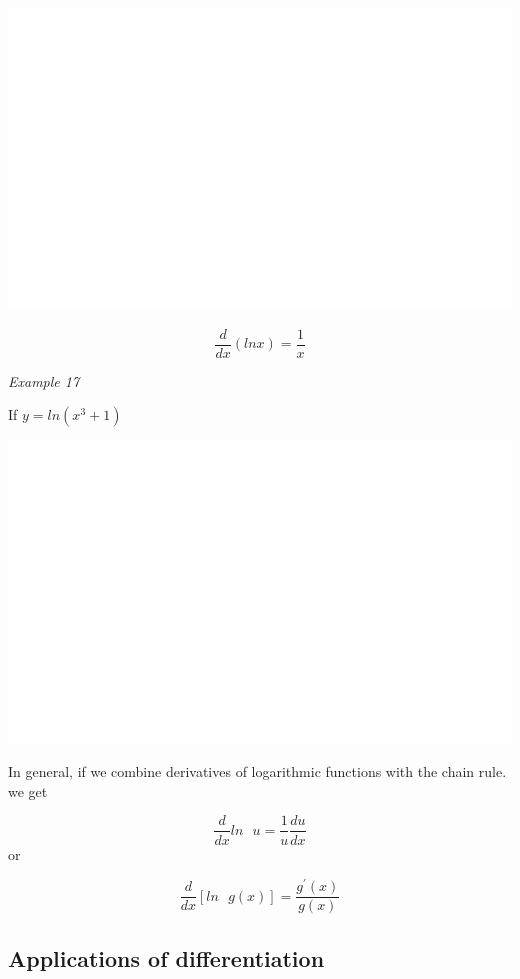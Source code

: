 \documentclass[]{book}
\begin{document}
\begin{center}\includegraphics[width=1\linewidth]{figure/LB28-1} \end{center}

\[\frac{d}{dx}(lnx)= \frac{1}{x}\]

\emph{Example 17}

If \(y=ln(x^3+1)\)

\begin{center}\includegraphics[width=1\linewidth]{figure/LB29-1} \end{center}

In general, if we combine derivatives of logarithmic functions with the chain rule. we get

\[\frac{d}{dx}{ln\text{ } u} = \frac{1}{u}\frac{du}{dx}\]
or

\[\frac{d}{dx}{[ln\text{ } g(x)]} = \frac{g^\prime (x)}{g(x)}\]

\hypertarget{applications-of-differentiation}{%
\subsection{Applications of differentiation}\label{applications-of-differentiation}}
\end{document}
